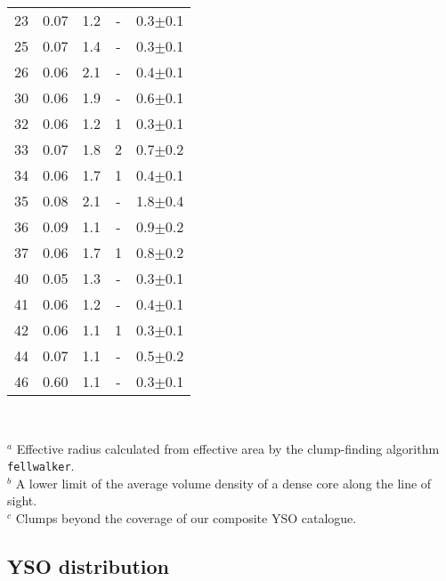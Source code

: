 \begin{table}
\begin{tabular}{|lllcl}
23       & 0.07   & 1.2                          & -          & 0.3$\pm$0.1        \\
25       & 0.07   & 1.4                          & -          & 0.3$\pm$0.1        \\
26       & 0.06   & 2.1                          & -          & 0.4$\pm$0.1        \\
30       & 0.06   & 1.9                          & -          & 0.6$\pm$0.1        \\
32       & 0.06   & 1.2                          & 1          & 0.3$\pm$0.1        \\
33       & 0.07   & 1.8                          & 2          & 0.7$\pm$0.2        \\
34       & 0.06   & 1.7                          & 1          & 0.4$\pm$0.1        \\
35       & 0.08   & 2.1                          & -          & 1.8$\pm$0.4        \\
36       & 0.09   & 1.1                          & -          & 0.9$\pm$0.2        \\
37       & 0.06   & 1.7                          & 1          & 0.8$\pm$0.2        \\
40       & 0.05   & 1.3                          & -          & 0.3$\pm$0.1        \\
41       & 0.06   & 1.2                          & -          & 0.4$\pm$0.1        \\
42       & 0.06   & 1.1                          & 1          & 0.3$\pm$0.1        \\
44       & 0.07   & 1.1                          & -          & 0.5$\pm$0.2        \\
46       & 0.60    & 1.1                          & -          & 0.3$\pm$0.1       \\
\hline
\end{tabular}\\
\raggedright
$^{a}$ Effective radius calculated from effective area by the clump-finding algorithm \texttt{fellwalker}.\\         
$^{b}$ A lower limit of the average volume density of a dense core along the line of sight.\\       
$^{c}$ Clumps beyond the coverage of our composite YSO catalogue.\\
\label{tab:dense}
\end{table}

\subsection{YSO distribution}

